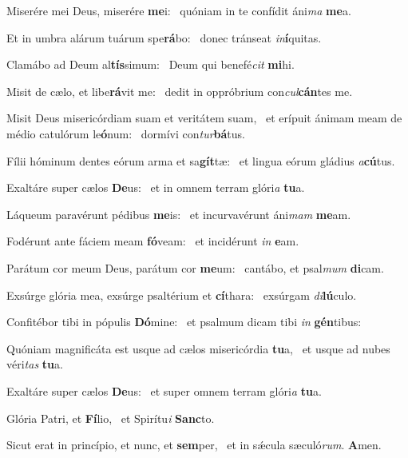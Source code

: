 \item Miserére mei Deus, miserére \textbf{me}i:~\psstar{} quóniam in te confídit áni\textit{ma} \textbf{me}a.
\item Et in umbra alárum tuárum spe\textbf{rá}bo:~\psstar{} donec tránseat \textit{in}\textbf{í}quitas.
\item Clamábo ad Deum al\textbf{tís}si\-mum:~\psstar{} Deum qui benefé\textit{cit} \textbf{mi}hi.
\item Misit de cælo, et libe\textbf{rá}vit me:~\psstar{} dedit in oppróbrium con\textit{cul}\textbf{cán}tes me.
\item Misit Deus misericórdiam suam et veritátem suam,~\pscross{} et erípuit ánimam meam de médio catulórum le\textbf{ó}num:~\psstar{} dormívi con\textit{tur}\textbf{bá}tus.
\item Fílii hóminum dentes eórum arma et sa\textbf{gít}tæ:~\psstar{} et lingua eórum gládius \textit{a}\textbf{cú}tus.
\item Exaltáre super cælos \textbf{De}us:~\psstar{} et in omnem terram glóri\textit{a} \textbf{tu}a.
\item Láqueum paravérunt pédibus \textbf{me}is:~\psstar{} et incurvavérunt áni\textit{mam} \textbf{me}am.
\item Fodérunt ante fáciem meam \textbf{fó}veam:~\psstar{} et incidérunt \textit{in} \textbf{e}am.
\item Parátum cor meum Deus, parátum cor \textbf{me}um:~\psstar{} cantábo, et psal\textit{mum} \textbf{di}cam.
\item Exsúrge glória mea, exsúrge psaltérium et \textbf{cí}thara:~\psstar{} exsúrgam \textit{di}\textbf{lú}culo.
\item Confitébor tibi in pópulis \textbf{Dó}mine:~\psstar{} et psalmum dicam tibi \textit{in} \textbf{gén}tibus:
\item Quóniam magnificáta est usque ad cælos misericórdia \textbf{tu}a,~\psstar{} et usque ad nubes véri\textit{tas} \textbf{tu}a.
\item Exaltáre super cælos \textbf{De}us:~\psstar{} et super omnem terram glóri\textit{a} \textbf{tu}a.
\item Glória Patri, et \textbf{Fí}lio,~\psstar{} et Spirítu\textit{i} \textbf{Sanc}to.
\item Sicut erat in princípio, et nunc, et \textbf{sem}per,~\psstar{} et in sǽcula sæculó\textit{rum}. \textbf{A}men.